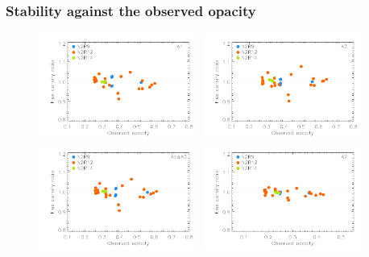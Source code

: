 \subsubsection{Stability against the observed opacity}


\begin{figure}[ht!]
\begin{center}
\includegraphics[clip=true,width=0.47\textwidth]{Figures/Calibration/plot_flux_density_ratio_obstau_primary_a1.pdf}
\includegraphics[clip=true,width=0.47\textwidth]{Figures/Calibration/plot_flux_density_ratio_obstau_primary_a3.pdf}
\includegraphics[clip=true,width=0.47\textwidth]{Figures/Calibration/plot_flux_density_ratio_obstau_primary_1mm.pdf}
\includegraphics[clip=true,width=0.47\textwidth]{Figures/Calibration/plot_flux_density_ratio_obstau_primary_a2.pdf}

\end{center}
\end{figure}
